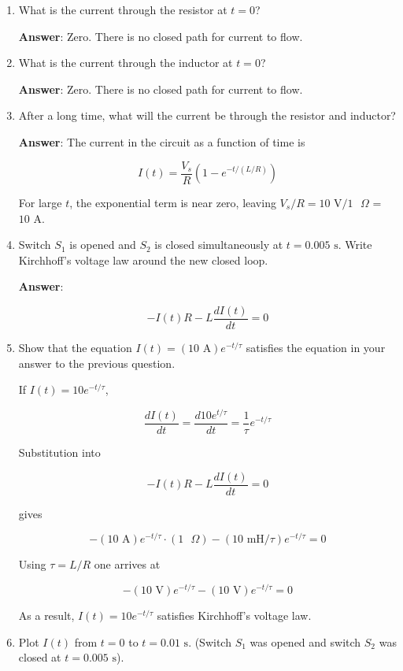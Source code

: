 \documentclass{article}
\begin{document}
\begin{enumerate}

  \item What is the current through the resistor at $t=0$?

        \ifsolutions
        \textbf{Answer}: Zero. There is no closed path for current to flow.
        \else
        \vskip 36pt
        \fi

  \item What is the current through the inductor at $t=0$?

        \ifsolutions
        \textbf{Answer}: Zero. There is no closed path for current to flow.
        \else
        \vskip 36pt
        \fi

  \item After a long time, what will the current be through the resistor and inductor?

        \ifsolutions
        \textbf{Answer}: The current in the circuit as a function of time is

        $$
        I(t)=  \frac{V_s}{R}\left(1-e^{-t/(L/R)}\right)
        $$

        For large $t$, the exponential term is near zero, leaving $V_s/R=10\text{ V}/1 \text{ }\Omega$ = $10\text{ A}$.
        \else
        \vskip 36pt
        \fi

  \item Switch $S_1$ is opened and $S_2$ is closed simultaneously at $t=0.005\text{ s}$. Write Kirchhoff's voltage law around the new closed loop.

        \ifsolutions
        \textbf{Answer}:

        $$-I(t)R - L \frac{dI(t)}{dt} = 0$$
        \else
        \vskip 36pt
        \fi

  \item Show that the equation $I(t)=(10\text{ A})e^{-t/\tau}$ satisfies the equation in your answer to the previous question.

        \ifsolutions
        If $I(t)=10e^{-t/\tau}$,

        $$\frac{dI(t)}{dt}= \frac{d 10e^{t/\tau}}{dt} = \frac{1}{\tau} e^{-t/\tau}$$

        Substitution into

        $$-I(t)R - L \frac{dI(t)}{dt} = 0$$

        gives

        $$-(10\text{ A})e^{-t/\tau} \cdot (1\text{ }\Omega) - (10\text{ mH}/\tau)e^{-t/\tau} = 0$$

        Using $\tau = L/R$ one arrives at

        $$-(10\text{ V})e^{-t/\tau} - (10\text{ V})e^{-t/\tau} = 0$$

        As a result, $I(t)=10e^{-t/\tau}$ satisfies Kirchhoff's voltage law.
        \else
        \vskip 36pt
        \fi

  \item Plot $I(t)$ from $t=0$ to $t=0.01\text{ s}$. (Switch $S_1$ was opened and switch $S_2$ was closed at $t=0.005\text{ s}$).

        

\end{enumerate}
\end{document}

